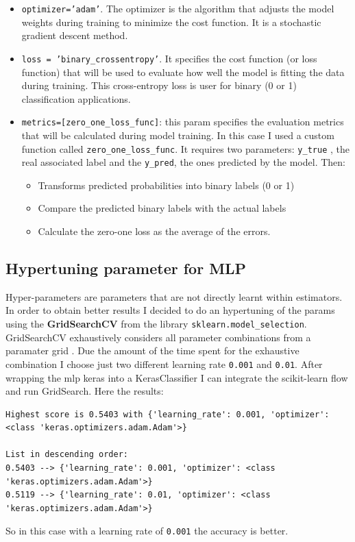 \begin{itemize}
\begin{itemize}
\item \texttt{optimizer='adam'}. The optimizer is the algorithm that adjusts the model weights during training to minimize the cost function. It is a stochastic gradient descent method.
\item \texttt{loss = 'binary\_crossentropy'}. It specifies the cost function (or loss function) that will be used to evaluate how well the model is fitting the data during training. This cross-entropy loss is user for binary (0 or 1) classification applications.
\item \texttt{metrics=[zero\_one\_loss\_func]}: this param specifies the evaluation metrics that will be calculated during model training. In this case I used a custom function called \texttt{zero\_one\_loss\_func}. It requires two parameters: \texttt{y\_true} , the real associated label and the \texttt{y\_pred}, the ones predicted by the model. Then:
\begin{itemize}
\item Transforms predicted probabilities into binary labels (0 or 1)
\item Compare the predicted binary labels with the actual labels
\item Calculate the zero-one loss as the average of the errors.
\end{itemize}
\end{itemize}
\end{itemize}
\subsection{Hypertuning parameter for MLP}
Hyper-parameters are parameters that are not directly learnt within estimators.
In order to obtain better results I decided to do an hypertuning of the params using the \textbf{GridSearchCV} from the library \texttt{sklearn.model\_selection}.  GridSearchCV exhaustively considers all parameter combinations from a paramater grid \cite{scikitgs}.
Due the amount of the time spent for the exhaustive combination I choose just two different learning rate \texttt{0.001} and  \texttt{0.01}.
After wrapping the mlp keras into a KerasClassifier I can integrate the scikit-learn flow and run GridSearch. Here the results:
\begin{lstlisting}
Highest score is 0.5403 with {'learning_rate': 0.001, 'optimizer': <class 'keras.optimizers.adam.Adam'>} 

List in descending order:
0.5403 --> {'learning_rate': 0.001, 'optimizer': <class 'keras.optimizers.adam.Adam'>} 
0.5119 --> {'learning_rate': 0.01, 'optimizer': <class 'keras.optimizers.adam.Adam'>} 
\end{lstlisting}
So in this case with a learning rate of \texttt{0.001} the accuracy is better.
